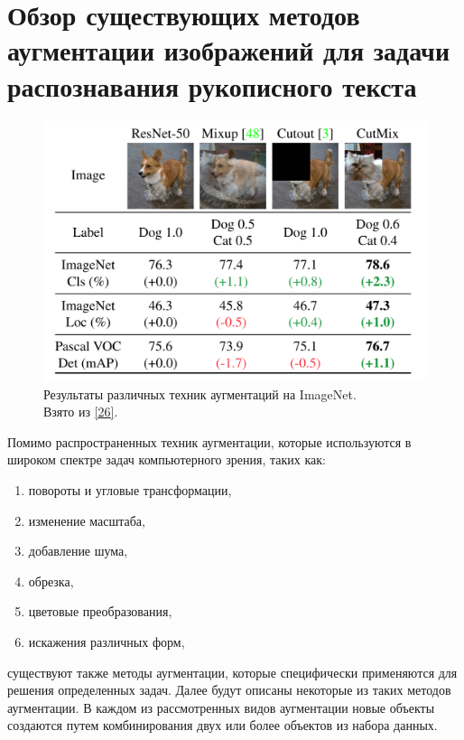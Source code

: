 \section{Обзор существующих методов аугментации изображений для задачи распознавания рукописного текста}
\label{sec:Chapter2} 

\begin{figure}
    \centering
    \includegraphics[scale=0.25]{./images/cutmix.png}
    \caption{\protect\hypertarget{image7}{Результаты различных техник аугментаций на ImageNet. \\ Взято из \protect\hyperlink{cite.Yun19}{[26]}}.}
\end{figure}

Помимо распространенных техник аугментации, которые используются в широком спектре задач компьютерного зрения, таких как:
\begin{enumerate}
\item повороты и угловые трансформации,
\item изменение масштаба,
\item добавление шума,
\item обрезка,
\item цветовые преобразования,
\item искажения различных форм,
\end{enumerate}
существуют также методы аугментации, которые специфически применяются для решения определенных задач. Далее будут описаны некоторые из таких методов аугментации. В каждом из рассмотренных видов аугментации новые объекты создаются путем комбинирования двух или более объектов из набора данных.

